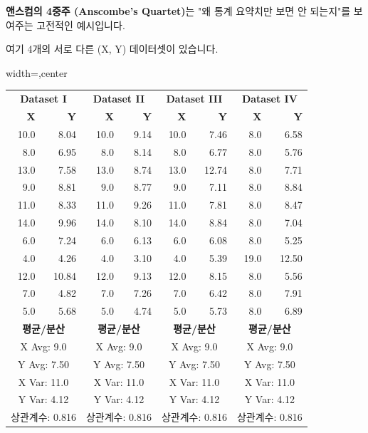\documentclass[11pt,a4paper]{book}
\theoremstyle{definition}
\begin{document}
\begin{warningbox}
\textbf{앤스컴의 4중주 (Anscombe's Quartet)}는 "왜 통계 요약치만 보면 안 되는지"를 보여주는 고전적인 예시입니다.

여기 4개의 서로 다른 (X, Y) 데이터셋이 있습니다.

\begin{adjustbox}{width=\textwidth,center}
\begin{tabular}{@{}rr|rr|rr|rr@{}}
\toprule
\multicolumn{2}{c|}{\textbf{Dataset I}} & \multicolumn{2}{c|}{\textbf{Dataset II}} & \multicolumn{2}{c|}{\textbf{Dataset III}} & \multicolumn{2}{c}{\textbf{Dataset IV}} \\
\textbf{X} & \textbf{Y} & \textbf{X} & \textbf{Y} & \textbf{X} & \textbf{Y} & \textbf{X} & \textbf{Y} \\
\midrule
10.0 & 8.04 & 10.0 & 9.14 & 10.0 & 7.46 & 8.0 & 6.58 \\
8.0 & 6.95 & 8.0 & 8.14 & 8.0 & 6.77 & 8.0 & 5.76 \\
13.0 & 7.58 & 13.0 & 8.74 & 13.0 & 12.74 & 8.0 & 7.71 \\
9.0 & 8.81 & 9.0 & 8.77 & 9.0 & 7.11 & 8.0 & 8.84 \\
11.0 & 8.33 & 11.0 & 9.26 & 11.0 & 7.81 & 8.0 & 8.47 \\
14.0 & 9.96 & 14.0 & 8.10 & 14.0 & 8.84 & 8.0 & 7.04 \\
6.0 & 7.24 & 6.0 & 6.13 & 6.0 & 6.08 & 8.0 & 5.25 \\
4.0 & 4.26 & 4.0 & 3.10 & 4.0 & 5.39 & 19.0 & 12.50 \\
12.0 & 10.84 & 12.0 & 9.13 & 12.0 & 8.15 & 8.0 & 5.56 \\
7.0 & 4.82 & 7.0 & 7.26 & 7.0 & 6.42 & 8.0 & 7.91 \\
5.0 & 5.68 & 5.0 & 4.74 & 5.0 & 5.73 & 8.0 & 6.89 \\
\midrule
\multicolumn{2}{c|}{\textbf{평균/분산}} & \multicolumn{2}{c|}{\textbf{평균/분산}} & \multicolumn{2}{c|}{\textbf{평균/분산}} & \multicolumn{2}{c}{\textbf{평균/분산}} \\
\multicolumn{2}{c|}{X Avg: 9.0} & \multicolumn{2}{c|}{X Avg: 9.0} & \multicolumn{2}{c|}{X Avg: 9.0} & \multicolumn{2}{c}{X Avg: 9.0} \\
\multicolumn{2}{c|}{Y Avg: 7.50} & \multicolumn{2}{c|}{Y Avg: 7.50} & \multicolumn{2}{c|}{Y Avg: 7.50} & \multicolumn{2}{c}{Y Avg: 7.50} \\
\multicolumn{2}{c|}{X Var: 11.0} & \multicolumn{2}{c|}{X Var: 11.0} & \multicolumn{2}{c|}{X Var: 11.0} & \multicolumn{2}{c}{X Var: 11.0} \\
\multicolumn{2}{c|}{Y Var: 4.12} & \multicolumn{2}{c|}{Y Var: 4.12} & \multicolumn{2}{c|}{Y Var: 4.12} & \multicolumn{2}{c}{Y Var: 4.12} \\
\multicolumn{2}{c|}{상관계수: 0.816} & \multicolumn{2}{c|}{상관계수: 0.816} & \multicolumn{2}{c|}{상관계수: 0.816} & \multicolumn{2}{c}{상관계수: 0.816} \\
\bottomrule
\end{tabular}
\end{adjustbox}


\end{warningbox}
\end{document}
